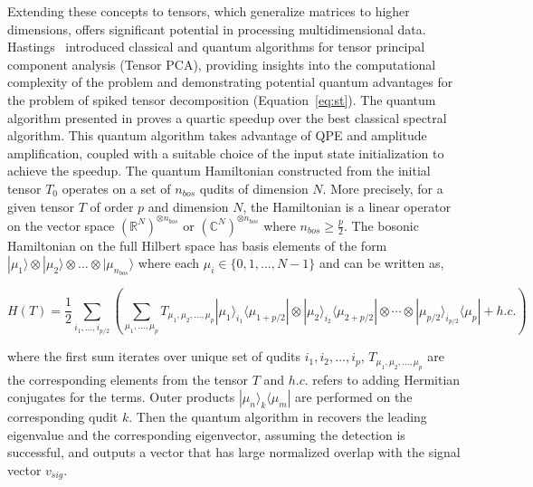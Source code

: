 Extending these concepts to tensors, which generalize matrices to higher dimensions, offers significant potential in processing multidimensional data. Hastings~\cite{hastings2020classical} introduced classical and quantum algorithms for tensor principal component analysis (Tensor PCA), providing insights into the computational complexity of the problem and demonstrating potential quantum advantages for the problem of spiked tensor decomposition (Equation~\ref{eq:st}). The quantum algorithm presented in \cite{hastings2020classical} proves a quartic speedup over the best classical spectral algorithm. This quantum algorithm takes advantage of QPE and amplitude amplification, coupled with a suitable choice of the input state initialization to achieve the speedup. The quantum Hamiltonian constructed from the initial tensor $T_0$ operates on a set of $n_{bos}$ qudits of dimension $N$. More precisely, for a given tensor $T$ of order $p$ and dimension $N$, the Hamiltonian is a linear operator on the vector space $(\mathbb{R}^N)^{\otimes n_{bos}}$ or $(\mathbb{C}^N)^{\otimes n_{bos}}$ where $n_{bos} \geq \frac{p}{2}$. The bosonic Hamiltonian on the full Hilbert space has basis elements of the form $|\mu_1\rangle \otimes |\mu_2\rangle \otimes \dots \otimes |\mu_{n_{bos}} \rangle$ where each $\mu_i \in \{0, 1, \dots , N-1\}$ and can be written as,

\begin{equation}\label{eq:hamiltonian}
H(T) = \frac{1}{2} \sum_{i_1, \dots , i_{p/2}} \left( \sum_{\mu_1, \dots , \mu_p} T_{\mu_1, \mu_2, \dots, \mu_p} |\mu_1\rangle _{i_1} \langle \mu_{1+p/2} |\otimes |\mu_2\rangle _{i_2} \langle \mu_{2+p/2} |\otimes \cdots \otimes |\mu_{p/2}\rangle _{i_{p/2}} \langle \mu_{p}| + h.c.  \right)
\end{equation}

where the first sum iterates over unique set of qudits $i_1, i_2, \dots, i_p$, $T_{\mu_1, \mu_2, \dots, \mu_p}$ are the corresponding elements from the tensor $T$ and $h.c.$ refers to adding Hermitian conjugates for the terms. Outer products $|\mu_n\rangle _{k} \langle\mu_{m}|$ are performed on the corresponding qudit $k$. Then the quantum algorithm in \cite{hastings2020classical} recovers the leading eigenvalue and the corresponding eigenvector, assuming the detection is successful, and outputs a vector that has large normalized overlap with the signal vector $v_{sig}$. 

